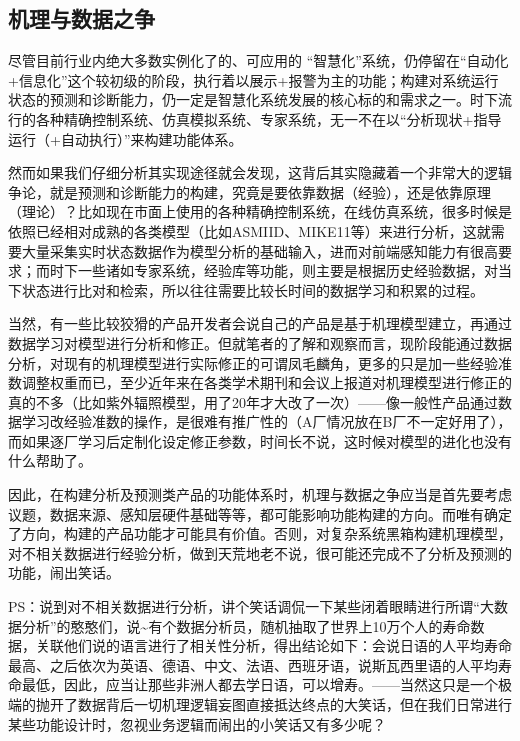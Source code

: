 \documentclass[]{book}
\begin{document}
\hypertarget{ux673aux7406ux4e0eux6570ux636eux4e4bux4e89}{%
\subsection{机理与数据之争}\label{ux673aux7406ux4e0eux6570ux636eux4e4bux4e89}}

尽管目前行业内绝大多数实例化了的、可应用的 ``智慧化''系统，仍停留在``自动化+信息化''这个较初级的阶段，执行着以展示+报警为主的功能；构建对系统运行状态的预测和诊断能力，仍一定是智慧化系统发展的核心标的和需求之一。时下流行的各种精确控制系统、仿真模拟系统、专家系统，无一不在以``分析现状+指导运行（+自动执行）''来构建功能体系。

然而如果我们仔细分析其实现途径就会发现，这背后其实隐藏着一个非常大的逻辑争论，就是预测和诊断能力的构建，究竟是要依靠数据（经验），还是依靠原理（理论）？比如现在市面上使用的各种精确控制系统，在线仿真系统，很多时候是依照已经相对成熟的各类模型（比如ASMIID、MIKE11等）来进行分析，这就需要大量采集实时状态数据作为模型分析的基础输入，进而对前端感知能力有很高要求；而时下一些诸如专家系统，经验库等功能，则主要是根据历史经验数据，对当下状态进行比对和检索，所以往往需要比较长时间的数据学习和积累的过程。

当然，有一些比较狡猾的产品开发者会说自己的产品是基于机理模型建立，再通过数据学习对模型进行分析和修正。但就笔者的了解和观察而言，现阶段能通过数据分析，对现有的机理模型进行实际修正的可谓凤毛麟角，更多的只是加一些经验准数调整权重而已，至少近年来在各类学术期刊和会议上报道对机理模型进行修正的真的不多（比如紫外辐照模型，用了20年才大改了一次）------像一般性产品通过数据学习改经验准数的操作，是很难有推广性的（A厂情况放在B厂不一定好用了），而如果逐厂学习后定制化设定修正参数，时间长不说，这时候对模型的进化也没有什么帮助了。

因此，在构建分析及预测类产品的功能体系时，机理与数据之争应当是首先要考虑议题，数据来源、感知层硬件基础等等，都可能影响功能构建的方向。而唯有确定了方向，构建的产品功能才可能具有价值。否则，对复杂系统黑箱构建机理模型，对不相关数据进行经验分析，做到天荒地老不说，很可能还完成不了分析及预测的功能，闹出笑话。

PS：说到对不相关数据进行分析，讲个笑话调侃一下某些闭着眼睛进行所谓``大数据分析''的憨憨们，说\textasciitilde{}有个数据分析员，随机抽取了世界上10万个人的寿命数据，关联他们说的语言进行了相关性分析，得出结论如下：会说日语的人平均寿命最高、之后依次为英语、德语、中文、法语、西班牙语，说斯瓦西里语的人平均寿命最低，因此，应当让那些非洲人都去学日语，可以增寿。------当然这只是一个极端的抛开了数据背后一切机理逻辑妄图直接抵达终点的大笑话，但在我们日常进行某些功能设计时，忽视业务逻辑而闹出的小笑话又有多少呢？
\end{document}
